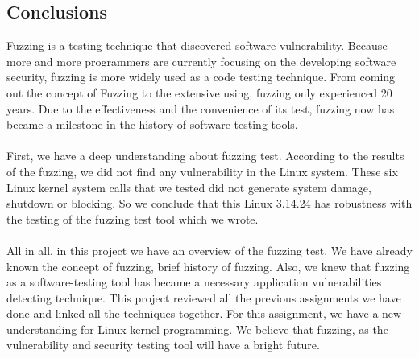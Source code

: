 \documentclass[twoside]{article}
\begin{document}
\begin{multicols}{2}

\section{Conclusions}

Fuzzing is a testing technique that discovered software vulnerability. Because more and more programmers are currently focusing on the developing software security, fuzzing is more widely used as a code testing technique.  From coming out the concept of Fuzzing to the extensive using, fuzzing only experienced 20 years. Due to the effectiveness and the convenience of its test, fuzzing now has became a milestone in the history of software testing tools.
\\\\
\noindent
First, we have a deep understanding about fuzzing test. According to the results of the fuzzing, we did not find any vulnerability in the Linux system. These six Linux kernel system calls that we tested did not generate system damage, shutdown or blocking. So we conclude that this Linux 3.14.24 has robustness with the testing of the fuzzing test tool which we wrote.
\\\\
\noindent
All in all, in this project we have an overview of the fuzzing test. We have already known the concept of fuzzing, brief history of fuzzing. Also, we knew that fuzzing as a software-testing tool has became a necessary application vulnerabilities detecting technique. This project reviewed all the previous assignments we have done and linked all the techniques together. For this assignment, we have a new understanding for Linux kernel programming. We believe that fuzzing, as the vulnerability and security testing tool will have a bright future.



\end{multicols}
\newpage
\nocite{*}
%
%


\newpage
\end{document}
